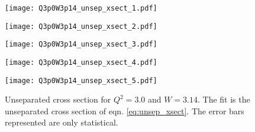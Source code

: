 \begin{figure}
  \centering
  \begin{minipage}[b]{0.48\linewidth}
    \texttt{[image: Q3p0W3p14\_unsep\_xsect\_1.pdf]}
  \end{minipage}
  \hfill
  \begin{minipage}[b]{0.48\linewidth}
    \texttt{[image: Q3p0W3p14\_unsep\_xsect\_2.pdf]}
  \end{minipage}
  \begin{minipage}[b]{0.48\linewidth}
    \texttt{[image: Q3p0W3p14\_unsep\_xsect\_3.pdf]}
  \end{minipage}
  \hfill
  \begin{minipage}[b]{0.48\linewidth}
    \texttt{[image: Q3p0W3p14\_unsep\_xsect\_4.pdf]}
  \end{minipage}
  \begin{minipage}[b]{0.48\linewidth}
    \texttt{[image: Q3p0W3p14\_unsep\_xsect\_5.pdf]}
  \end{minipage}  
  \caption{Unseparated cross section for $Q^2=3.0$ and $W=3.14$. The fit is the unseparated cross section of eqn. \ref{eq:unsep_xsect}. The error bars represented are only statistical.}
  \label{fig:Q3p0W3p14_unsep_xsect}
\end{figure}


